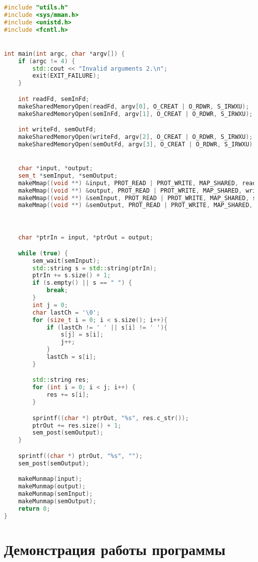 \documentclass[pdf, unicode, 12pt, a4paper,oneside,fleqn]{article}
\begin{document}
\begin{lstlisting}[language=C++]
#include "utils.h"
#include <sys/mman.h>
#include <unistd.h>
#include <fcntl.h>


int main(int argc, char *argv[]) {
    if (argc != 4) {
        std::cout << "Invalid arguments 2.\n";
        exit(EXIT_FAILURE);
    }

    int readFd, semInFd;
    makeSharedMemoryOpen(readFd, argv[0], O_CREAT | O_RDWR, S_IRWXU);
    makeSharedMemoryOpen(semInFd, argv[1], O_CREAT | O_RDWR, S_IRWXU);

    int writeFd, semOutFd;
    makeSharedMemoryOpen(writeFd, argv[2], O_CREAT | O_RDWR, S_IRWXU);
    makeSharedMemoryOpen(semOutFd, argv[3], O_CREAT | O_RDWR, S_IRWXU);


    char *input, *output;
    sem_t *semInput, *semOutput;
    makeMmap((void **) &input, PROT_READ | PROT_WRITE, MAP_SHARED, readFd);
    makeMmap((void **) &output, PROT_READ | PROT_WRITE, MAP_SHARED, writeFd);
    makeMmap((void **) &semInput, PROT_READ | PROT_WRITE, MAP_SHARED, semInFd);
    makeMmap((void **) &semOutput, PROT_READ | PROT_WRITE, MAP_SHARED, semOutFd);



    char *ptrIn = input, *ptrOut = output;

    while (true) {
        sem_wait(semInput);
        std::string s = std::string(ptrIn);
        ptrIn += s.size() + 1;
        if (s.empty() || s == " ") {
            break;
        }
        int j = 0;
        char lastCh = '\0';
        for (size_t i = 0; i < s.size(); i++){
            if (lastCh != ' ' || s[i] != ' '){
                s[j] = s[i];
                j++;
            }
            lastCh = s[i];
        }

        std::string res;
        for (int i = 0; i < j; i++) {
            res += s[i];
        }

        sprintf((char *) ptrOut, "%s", res.c_str());
        ptrOut += res.size() + 1;
        sem_post(semOutput);
    }

    sprintf((char *) ptrOut, "%s", "");
    sem_post(semOutput);

    makeMunmap(input);
    makeMunmap(output);
    makeMunmap(semInput);
    makeMunmap(semOutput);
    return 0;
}
\end{lstlisting}

\section{Демонстрация работы программы}
\end{document}
